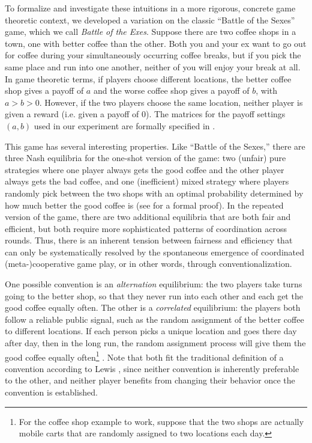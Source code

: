 \documentclass[10pt,letterpaper]{article}
\begin{document}
To formalize and investigate these intuitions in a more rigorous, concrete game theoretic context, we developed a variation on the classic ``Battle of the Sexes'' game, which we call \emph{Battle of the Exes}. Suppose there are two coffee shops in a town, one with better coffee than the other. Both you and your ex want to go out for coffee during your simultaneously occurring coffee breaks, but if you pick the same place and run into one another, neither of you will enjoy your break at all. In game theoretic terms, if players choose different locations, the better coffee shop gives a payoff of $a$ and the worse coffee shop gives a payoff of $b$, with $a > b > 0$. However, if the two players choose the same location, neither player is given a reward (i.e. given a payoff of 0). The matrices for the payoff settings $(a,b)$ used in our experiment are formally specified in .

This game has several interesting properties. Like ``Battle of the Sexes,'' there are three Nash equilibria for the one-shot version of the game: two (unfair) pure strategies where one player always gets the good coffee and the other player always gets the bad coffee, and one (inefficient) mixed strategy where players randomly pick between the two shops with an optimal probability determined by how much better the good coffee is (see  for a formal proof). In the repeated version of the game, there are two additional equilibria that are both fair and efficient, but both require more sophisticated patterns of coordination across rounds. Thus, there is an inherent tension between fairness and efficiency that can only be systematically resolved by the spontaneous emergence of coordinated (meta-)cooperative game play, or in other words, through conventionalization. 

One possible convention is an \emph{alternation} equilibrium: the two players take turns going to the better shop, so that they never run into each other and each get the good coffee equally often\cite{VanderschraafSkyrms03_LearningToTakeTurns, HelbingSchonhofStark05_EmpiricalTurnTaking, LauMui08_TurnTakingBattleOfTheSexes}. The other is a \emph{correlated} equilibrium: the players both follow a reliable public signal, such as the random assignment of the better coffee to different locations. If each person picks a unique location and goes there day after day, then in the long run, the random assignment process will give them the good coffee equally often\footnote{For the coffee shop example to work, suppose that the two shops are actually mobile carts that are randomly assigned to two locations each day.}  \cite{ Aumann74_CorrelativeEquilibria, GintisHelbing13_HomoSocialis}. Note that both fit the traditional definition of a convention according to Lewis \cite{Lewis69_Convention}, since neither convention is inherently preferable to the other, and neither player benefits from changing their behavior once the convention is established.
\end{document}
